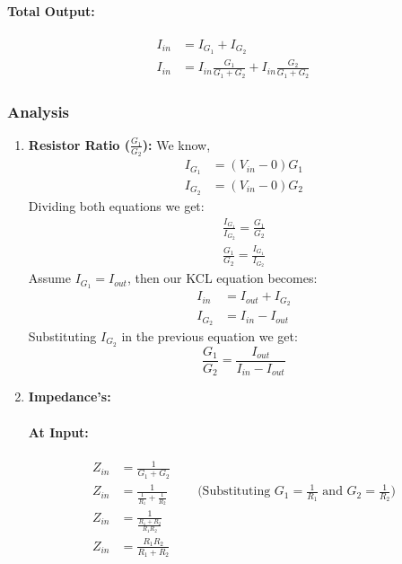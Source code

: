 \paragraph{Total Output:}
\begin{align*}
  I_{in} &= I_{G_1} + I_{G_2} \\
  I_{in} &= I_{in} \frac{G_1}{G_1 + G_2} + I_{in} \frac{G_2}{G_1 + G_2}
\end{align*}

\subsubsection{Analysis}
\begin{enumerate}
  \item \textbf{Resistor Ratio (\(\frac{G_1}{G_2}\)):}
    We know,
    \begin{align*}
      I_{G_1} &= (V_{in} - 0)G_1 \\
      I_{G_2} &= (V_{in} - 0)G_2
    \end{align*}
    Dividing both equations we get:
    \begin{align*}
      \frac{I_{G_1}}{I_{G_2}} = \frac{G_1}{G_2} \\
      \frac{G_1}{G_2} = \frac{I_{G_1}}{I_{G_2}}
    \end{align*}
    Assume \(I_{G_1} = I_{out}\), then our KCL equation
    becomes:
    \begin{align*}
      I_{in} &= I_{out} + I_{G_2} \\
      I_{G_2} &= I_{in} - I_{out}
    \end{align*}
    Substituting \(I_{G_2}\) in the previous equation
    we get:
    \[
      \frac{G_1}{G_2} = \frac{I_{out}}{I_{in} - I_{out}}
    \]
  \item \textbf{Impedance's:}
    \paragraph{At Input:}
      \begin{align*}
        Z_{in} &= \frac{1}{G_1 + G_2} \\
        Z_{in} &= \frac{1}{\frac{1}{R_1} + \frac{1}{R_2}} \hspace{1cm} \text{(Substituting \(G_1 = \frac{1}{R_1}\) and \(G_2 = \frac{1}{R_2}\))} \\
        Z_{in} &= \frac{1}{\frac{R_1 + R_2}{R_1 R_2}} \\
        Z_{in} &= \frac{R_1 R_2}{R_1 + R_2}
      \end{align*}

\end{enumerate}
